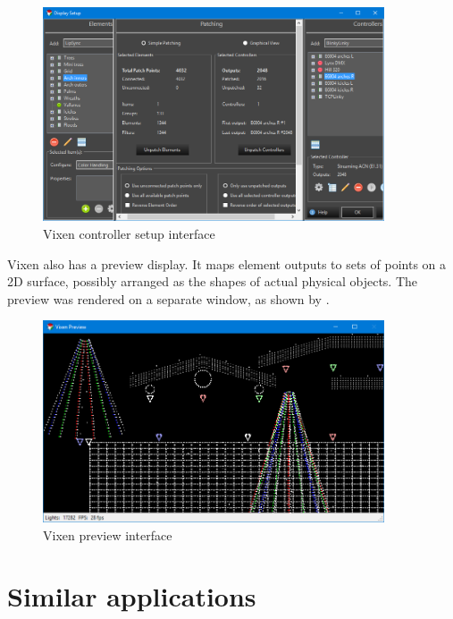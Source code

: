 \begin{figure}[!t]
  \centering
  \includegraphics[width=0.9\textwidth]{Figs//vixen_setup.png}
  \caption{\footnotesize Vixen controller setup interface}
  \label{fig:vixen-setup}
\end{figure}

Vixen also has a preview display. It maps element outputs to sets of points on a 2D surface, possibly arranged as the shapes of actual physical objects. The preview was rendered on a separate window, as shown by .

\begin{figure}[!t]
  \centering
  \includegraphics[width=0.9\textwidth]{Figs//vixen_preview.png}
  \caption{\footnotesize Vixen preview interface}
  \label{fig:vixen-preview}
\end{figure}

\section{Similar applications}


